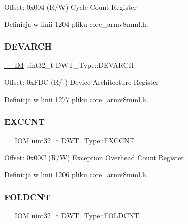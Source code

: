 Offset\+: 0x004 (R/W) Cycle Count Register 

Definicja w linii 1204 pliku core\+\_\+armv8mml.\+h.

\mbox{\label{struct_d_w_t___type_ae60dbff3143d15cd04ac984084d8fbc7}} 
\subsubsection{\texorpdfstring{D\+E\+V\+A\+R\+CH}{DEVARCH}}
{\footnotesize\ttfamily \hyperlink{core__sc300_8h_a4cc1649793116d7c2d8afce7a4ffce43}{\+\_\+\+\_\+\+IM} uint32\+\_\+t D\+W\+T\+\_\+\+Type\+::\+D\+E\+V\+A\+R\+CH}

Offset\+: 0x\+F\+BC (R/ ) Device Architecture Register 

Definicja w linii 1277 pliku core\+\_\+armv8mml.\+h.

\mbox{\label{struct_d_w_t___type_a9fe20c16c5167ca61486caf6832686d1}} 
\subsubsection{\texorpdfstring{E\+X\+C\+C\+NT}{EXCCNT}}
{\footnotesize\ttfamily \hyperlink{core__sc300_8h_ab6caba5853a60a17e8e04499b52bf691}{\+\_\+\+\_\+\+I\+OM} uint32\+\_\+t D\+W\+T\+\_\+\+Type\+::\+E\+X\+C\+C\+NT}

Offset\+: 0x00C (R/W) Exception Overhead Count Register 

Definicja w linii 1206 pliku core\+\_\+armv8mml.\+h.

\mbox{\label{struct_d_w_t___type_a1cfc48384ebd8fd8fb7e5d955aae6c97}} 
\subsubsection{\texorpdfstring{F\+O\+L\+D\+C\+NT}{FOLDCNT}}
{\footnotesize\ttfamily \hyperlink{core__sc300_8h_ab6caba5853a60a17e8e04499b52bf691}{\+\_\+\+\_\+\+I\+OM} uint32\+\_\+t D\+W\+T\+\_\+\+Type\+::\+F\+O\+L\+D\+C\+NT}

